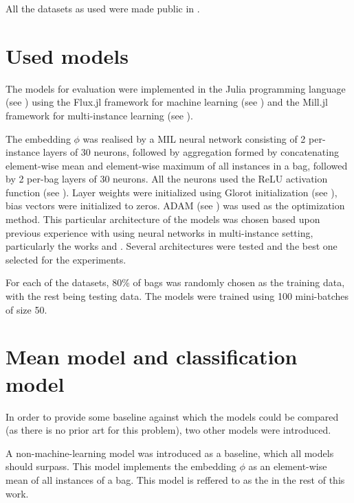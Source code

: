 All the datasets as used were made public in \cite{dedic_mildatasetsjl_2019}.

\section{Used models}

The models for evaluation were implemented in the Julia programming language (see \cite{bezanson_julia:_2017}) using the Flux.jl framework for machine learning (see \cite{innes_flux:_2018}) and the Mill.jl framework for multi-instance learning (see \cite{pevny_milljl_2019}).

The embedding \( \phi \) was realised by a MIL neural network consisting of 2 per-instance layers of 30 neurons, followed by aggregation formed by concatenating element-wise mean and element-wise maximum of all instances in a bag, followed by 2 per-bag layers of 30 neurons. All the neurons used the ReLU activation function (see \cite{hahnloser_digital_2000}). Layer weights were initialized using Glorot initialization (see \cite{glorot_understanding_2010}), bias vectors were initialized to zeros. ADAM (see \cite{kingma_adam:_2014}) was used as the optimization method. This particular architecture of the models was chosen based upon previous experience with using neural networks in multi-instance setting, particularly the works \cite{dedic_hierarchicke_2017} and \cite{pevny_nested_2020}. Several architectures were tested and the best one selected for the experiments.

For each of the datasets, 80\% of bags was randomly chosen as the training data, with the rest being testing data. The models were trained using 100 mini-batches of size 50.

\section{Mean model and classification model}\label{sec:baseline-models}

In order to provide some baseline against which the models could be compared (as there is no prior art for this problem), two other models were introduced.

A non-machine-learning model was introduced as a baseline, which all models should surpass. This model implements the embedding \( \phi \) as an element-wise mean of all instances of a bag. This model is reffered to as the  in the rest of this work.

